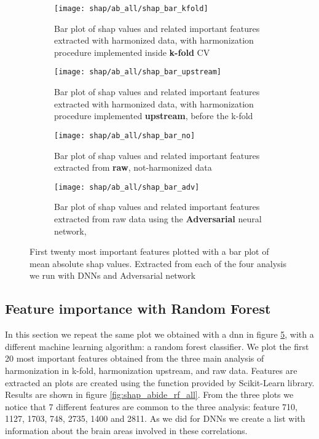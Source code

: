 \documentclass[11pt]{report}
\begin{document}
\begin{figure}[h!]
\centering
\begin{subfigure}[c]{.45\linewidth}
  \texttt{[image: shap/ab\_all/shap\_bar\_kfold]}
   \caption{Bar plot of shap values and related important features extracted with harmonized data, with harmonization procedure implemented inside \textbf{k-fold} CV}
   \label{fig:shap_bar_kfold_}
\end{subfigure}
\begin{subfigure}[c]{.45\textwidth}
   \texttt{[image: shap/ab\_all/shap\_bar\_upstream]}
   \caption{Bar plot of shap values and related important features extracted with harmonized data, with harmonization procedure implemented \textbf{upstream}, before the k-fold}
   \label{}
\end{subfigure}
\hspace{3mm}
\begin{subfigure}[c]{.45\textwidth}
   \texttt{[image: shap/ab\_all/shap\_bar\_no]}
   \caption{Bar plot of shap values and related important features extracted from \textbf{raw}, not-harmonized data}
   \label{}
\end{subfigure}
\begin{subfigure}[c]{.45\textwidth}
   \texttt{[image: shap/ab\_all/shap\_bar\_adv]}
   \caption{Bar plot of shap values and related important features extracted from raw data using the \textbf{Adversarial} neural network,}
   \label{}
\end{subfigure}
\caption{First twenty most important features plotted with a bar plot of mean absolute shap values. Extracted from each of the four analysis we run with DNNs and Adversarial network}
\label{fig:shap_abide_all}
\end{figure}





\subsection*{Feature importance with Random Forest}\label{sec:feature_importance_rf}
In this section we repeat the same plot we obtained with a dnn in figure \ref{fig:shap_abide_all}, with a different machine learning algorithm: a random forest classifier.
We plot the first 20 most important features obtained from the three main analysis of harmonization in k-fold, harmonization upstream, and raw data.
Features are extracted an plots are created using the function provided by Scikit-Learn library.
Results are shown in figure \ref{fig:shap_abide_rf_all}. From the three plots we notice that 7 different features are common to the three analysis: feature 710, 1127, 1703, 748, 2735, 1400 and 2811.
As we did for DNNs we create a list with information about the brain areas involved in these correlations.
\end{document}
